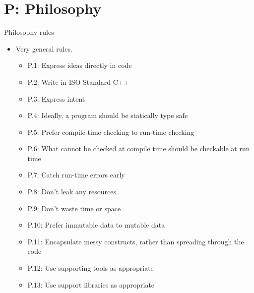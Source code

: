 \section{P: Philosophy}

\begin{frame}[t,shrink=10]{Philosophy rules}
\begin{itemize}
  \item Very general rules.

  \begin{itemize}
    \item P.1: Express ideas directly in code
    \item P.2: Write in ISO Standard C++
    \item P.3: Express intent
    \item P.4: Ideally, a program should be statically type safe
    \item P.5: Prefer compile-time checking to run-time checking
    \item P.6: What cannot be checked at compile time should be checkable at run time
    \item P.7: Catch run-time errors early
    \item P.8: Don’t leak any resources
    \item P.9: Don’t waste time or space
    \item P.10: Prefer immutable data to mutable data
    \item P.11: Encapsulate messy constructs, rather than spreading through the code
    \item P.12: Use supporting tools as appropriate
    \item P.13: Use support libraries as appropriate
  \end{itemize}
\end{itemize}
\end{frame}



